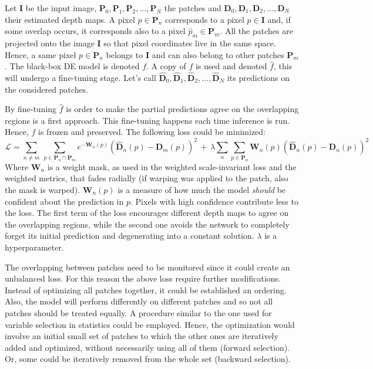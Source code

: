 Let $\mathbf{I}$ be the input image, $\mathbf{P}_{0}, \mathbf{P}_{1}, \mathbf{P}_{2}, \dotsc, \mathbf{P}_{N}$ the patches and $\mathbf{D}_{0}, \mathbf{D}_{1}, \mathbf{D}_{2}, \dotsc, \mathbf{D}_{N}$ their estimated depth maps.
A pixel $p \in \mathbf{P}_{n}$ corresponds to a pixel $\hat{p} \in \mathbf{I}$ and, if some overlap occurs, it corresponds also to a pixel $\hat{p}_{m} \in \mathbf{P}_{m}$.
All the patches are projected onto the image $\mathbf{I}$ so that pixel coordinates live in the same space.
Hence, a same pixel $p \in \mathbf{P}_{n}$ belongs to $\mathbf{I}$ and can also belong to other patches $\mathbf{P}_{m}$.
The black-box DE model is denoted $f$.
A copy of $f$ is used and denoted $\hat{f}$, this will undergo a fine-tuning stage.
Let's call $\hat{\mathbf{D}}_{0}, \hat{\mathbf{D}}_{1}, \hat{\mathbf{D}}_{2}, \dotsc, \hat{\mathbf{D}}_{N}$ its predictions on the considered patches.

By fine-tuning $\hat{f}$ is order to make the partial predictions agree on the overlapping regions is a first approach.
This fine-tuning happens each time inference is run.
Hence, $f$ is frozen and preserved.
The following loss could be minimized:
\[
    \mathcal{L} =
        \sum_{n \neq m} \,
        \sum_{p \in \mathbf{P}_{n} \cap \mathbf{P}_{m}}
        e^{-\mathbf{W}_{n}(p)}
        (\hat{\mathbf{D}}_{n}(p) - \mathbf{D}_{m}(p))^{2}
        \, + \,
        \lambda
        \sum_{n}
        \sum_{p \in \mathbf{P}_{n}}
        \mathbf{W}_{n}(p)
        (\hat{\mathbf{D}}_{n}(p) - \mathbf{D}_{n}(p))^{2}
\]
Where $\mathbf{W}_{n}$ is a weight mask, as used in the weighted scale-invariant loss and the weighted metrics, that fades radially (if warping was applied to the patch, also the mask is warped).
$\mathbf{W}_{n}(p)$ is a measure of how much the model \textit{should} be confident about the prediction in $p$.
Pixels with high confidence contribute less to the loss.
The first term of the loss encourages different depth maps to agree on the overlapping regions, while the second one avoids the network to completely forget its initial prediction and degenerating into a constant solution. 
$\lambda$ is a hyperparameter.

The overlapping between patches need to be monitored since it could create an unbalanced loss.
For this reason the above loss require further modifications.
Instead of optimizing all patches together, it could be established an ordering.
Also, the model will perform differently on different patches and so not all patches should be treated equally.
A procedure similar to the one used for variable selection in statistics could be employed.
Hence, the optimization would involve an initial small set of patches to which the other ones are iteratively added and optimized, without necessarily using all of them (forward selection).
Or, some could be iteratively removed from the whole set (backward selection).

